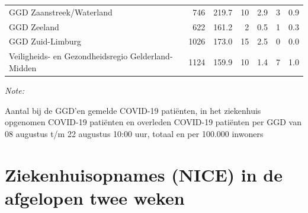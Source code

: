 \documentclass[
  english,
  man,floatsintext]{apa6}
\begin{document}
\begin{table}
\begin{threeparttable}
\begin{tabular}{lrrrrrr}
GGD Zaanstreek/Waterland & 746 & 219.7 & 10 & 2.9 & 3 & 0.9\\
GGD Zeeland & 622 & 161.2 & 2 & 0.5 & 1 & 0.3\\
GGD Zuid-Limburg & 1026 & 173.0 & 15 & 2.5 & 0 & 0.0\\
Veiligheids- en Gezondheidsregio Gelderland-Midden & 1124 & 159.9 & 10 & 1.4 & 7 & 1.0\\
\bottomrule
\end{tabular}
\begin{tablenotes}
\item \textit{Note: } 
\item Aantal bij de GGD’en gemelde COVID-19 patiënten, in het ziekenhuis opgenomen COVID-19 patiënten en overleden COVID-19 patiënten per GGD van 08 augustus t/m 22 augustus 10:00 uur, totaal en per 100.000 inwoners
\end{tablenotes}
\end{threeparttable}
\endgroup{}
\end{table}

\newpage

\hypertarget{ziekenhuisopnames-nice-in-de-afgelopen-twee-weken}{%
\section{Ziekenhuisopnames (NICE) in de afgelopen twee weken}\label{ziekenhuisopnames-nice-in-de-afgelopen-twee-weken}}
\end{document}
